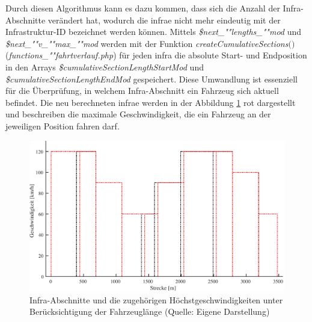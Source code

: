 Durch diesen Algorithmus kann es dazu kommen, dass sich die Anzahl der Infra-Abschnitte verändert hat, wodurch die \ac{infra}e nicht mehr eindeutig mit der Infrastruktur-ID bezeichnet werden können. Mittels \textit{\$next\_""lengths\_""mod} und \textit{\$next\_""v\_""max\_""mod} werden mit der Funktion \textit{create\-Cumulative\-Sec\-tions$($$)$} (\textit{func\-tions\_""fahrt\-ver\-lauf.php}) für jeden \ac{infra} die absolute Start- und Endposition in den Arrays \textit{\$cumulative\-Section\-Length\-Start\-Mod} und \textit{\$cumulativeSectionLengthEndMod} gespeichert. Diese Umwandlung ist essenziell für die Überprüfung, in welchem Infra-Abschnitt ein Fahrzeug sich aktuell befindet. Die neu berechneten \ac{infra}e werden in der Abbildung \ref{fig:it2} rot dargestellt und beschreiben die maximale Geschwindigkeit, die ein Fahrzeug an der jeweiligen Position fahren darf.
\begin{figure}
\includegraphics[width=\linewidth]{../images/matlab/it2.pdf}
\caption[Infra-Abschnitte und die zugehörigen Höchstgeschwindigkeiten unter Berücksichtigung der Fahrzeuglänge]{Infra-Abschnitte und die zugehörigen Höchstgeschwindigkeiten unter Berücksichtigung der Fahrzeuglänge (Quelle: Eigene Darstellung)}
\label{fig:it2}
\end{figure}
